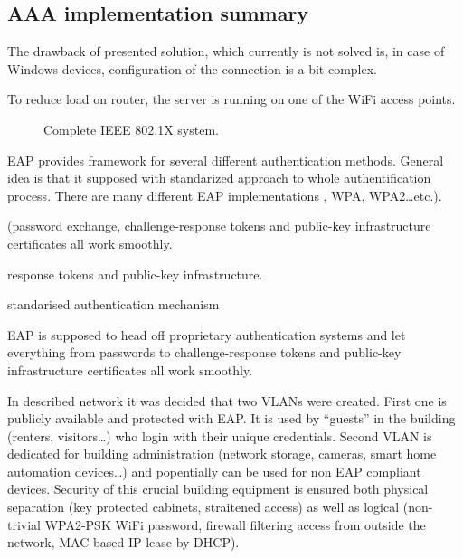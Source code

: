 \documentclass{llncs}
\begin{document}
\subsection{AAA implementation summary}

The drawback of presented solution, which currently is not solved is, in case of Windows devices, configuration of the connection is a bit complex.  




To reduce load on router, the server is running on one of the WiFi access points. 

 



\begin{figure}
	\vspace{-15pt}
	\caption{Complete IEEE 802.1X system.}
\end{figure}



EAP provides framework for several different authentication methods. General
idea is that it supposed  with standarized
approach to whole authentification process. There are many different EAP
implementations , WPA, WPA2\ldots etc.).


 (password exchange,
challenge-response tokens and public-key infrastructure certificates all work smoothly.

 response tokens and public-key infrastructure.


standarised authentication mechanism

 EAP is supposed to head off
proprietary authentication systems and let everything from passwords to challenge-response tokens and public-key
infrastructure certificates all work smoothly.

In described network it was decided that two VLANs were created. First one is
publicly available and protected with EAP. It is used by ``guests'' in the building
(renters, visitors\ldots) who login with their unique credentials. Second VLAN
is dedicated for building administration (network storage, cameras, smart home
automation devices\ldots) and popentially can be used for non EAP compliant
devices. Security of this crucial building equipment is ensured both physical
separation (key protected cabinets, straitened access) as well as logical
(non-trivial WPA2-PSK WiFi password, firewall filtering access from outside the
network, MAC based IP lease by DHCP). 
\end{document}
